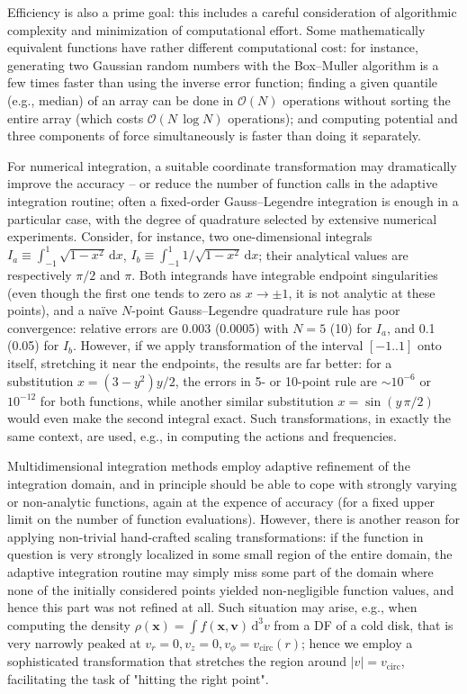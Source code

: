 \documentclass[12pt]{article}
\newcommand{\D}{\mathrm{d}}
\newcommand{\bv}{\boldsymbol{v}}
\newcommand{\bx}{\boldsymbol{x}}
\begin{document}
Efficiency is also a prime goal: this includes a careful consideration of algorithmic complexity and minimization of computational effort. Some mathematically equivalent functions have rather different computational cost: for instance, generating two Gaussian random numbers with the Box--Muller algorithm is a few times faster than using the inverse error function; finding a given quantile (e.g., median) of an array can be done in $\mathcal{O}(N)$ operations without sorting the entire array (which costs $\mathcal{O}(N\,\log N)$ operations); and computing potential and three components of force simultaneously is faster than doing it separately.

For numerical integration, a suitable coordinate transformation may dramatically improve the accuracy -- or reduce the number of function calls in the adaptive integration routine; often a fixed-order Gauss--Legendre integration is enough in a particular case, with the degree of quadrature selected by extensive numerical experiments.
Consider, for instance, two one-dimensional integrals $I_a \equiv \int_{-1}^1 \sqrt{1-x^2}\,\D x$,
$I_b \equiv \int_{-1}^1 1/\sqrt{1-x^2}\,\D x$; their analytical values are respectively $\pi/2$ and $\pi$. Both integrands have integrable endpoint singularities (even though the first one tends to zero as $x\to \pm 1$, it is not analytic at these points), and a na\"ive $N$-point Gauss--Legendre quadrature rule has poor convergence: relative errors are 0.003 (0.0005) with $N=5$ (10) for $I_a$, and 0.1 (0.05) for $I_b$. However, if we apply transformation of the interval $[-1..1]$ onto itself, stretching it near the endpoints, the results are far better: for a substitution $x = (3-y^2)y/2$, the errors in 5- or 10-point rule are $\sim10^{-6}$ or $10^{-12}$ for both functions, while another similar substitution $x = \sin(y\,\pi/2)$ would even make the second integral exact. Such transformations, in exactly the same context, are used, e.g., in computing the actions and frequencies.

Multidimensional integration methods employ adaptive refinement of the integration domain, and in principle should be able to cope with strongly varying or non-analytic functions, again at the expence of accuracy (for a fixed upper limit on the number of function evaluations). However, there is another reason for applying non-trivial hand-crafted scaling transformations: if the function in question is very strongly localized in some small region of the entire domain, the adaptive integration routine may simply miss some part of the domain where none of the initially considered points yielded non-negligible function values, and hence this part was not refined at all. Such situation may arise, e.g., when computing the density $\rho(\bx) = \int f(\bx,\bv)\,\D^3v$ from a DF of a cold disk, that is very narrowly peaked at $v_r=0, v_z=0, v_\phi=v_\mathrm{circ}(r)$; hence we employ a sophisticated transformation that stretches the region around $|v| = v_\mathrm{circ}$, facilitating the task of "hitting the right point".
\end{document}
